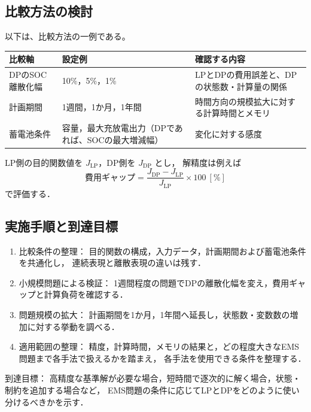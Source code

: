 \documentclass[a4paper,11pt,dvipdfmx]{jsarticle}
\newcommand{\term}[1]{#1}
\begin{document}
\subsection{比較方法の検討}
以下は、比較方法の一例である。
\begin{center}
  \begin{tabular}{p{30mm}p{52mm}p{72mm}}
    \toprule
    比較軸 & 設定例                          & 確認する内容 \\
    \midrule
    DPのSOC離散化幅
        & 10\%，5\%，1\%
        & LPとDPの費用誤差と、DPの状態数・計算量の関係             \\
    計画期間
        & 1週間，1か月，1年間
        & 時間方向の規模拡大に対する計算時間とメモリ                 \\
    蓄電池条件
        & 容量，最大充放電出力（DPであれば、SOCの最大増減幅）
        & 変化に対する感度                              \\
    \bottomrule
  \end{tabular}
\end{center}

LP側の目的関数値を $J_{\mathrm{LP}}$，DP側を $J_{\mathrm{DP}}$ とし，
解精度は例えば
\begin{equation}
  \text{費用ギャップ}=
  \frac{J_{\mathrm{DP}}-J_{\mathrm{LP}}}{J_{\mathrm{LP}}}\times100\ [\%]
  \label{eq:gap}
\end{equation}
で評価する．

\subsection{実施手順と到達目標}

\begin{enumerate}
  \item \term{比較条件の整理}：
        目的関数の構成，入力データ，計画期間および蓄電池条件を共通化し，
        連続表現と離散表現の違いは残す．
  \item \term{小規模問題による検証}：
        1週間程度の問題でDPの離散化幅を変え，費用ギャップと計算負荷を確認する．
  \item \term{問題規模の拡大}：
        計画期間を1か月，1年間へ延長し，状態数・変数数の増加に対する挙動を調べる．
  \item \term{適用範囲の整理}：
        精度，計算時間，メモリの結果と，どの程度大きなEMS問題まで各手法で扱えるかを踏まえ，
        各手法を使用できる条件を整理する．
\end{enumerate}

\noindent
到達目標：
高精度な基準解が必要な場合，短時間で逐次的に解く場合，状態・制約を追加する場合など，
EMS問題の条件に応じてLPとDPをどのように使い分けるべきかを示す．
\end{document}
